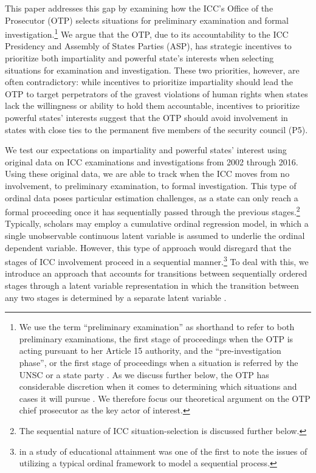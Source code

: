 This paper addresses this gap by examining how the ICC's Office of the Prosecutor (OTP) selects situations for preliminary examination and formal investigation.\footnote{We use the term ``preliminary examination'' as shorthand to refer to both preliminary examinations, the first stage of proceedings when the OTP is acting pursuant to her Article 15 authority, and the ``pre-investigation phase'', or the first stage of proceedings when a situation is referred by the UNSC or a state party \citep{schabas2011introduction}. As we discuss further below, the OTP has considerable discretion when it comes to determining which situations and cases it will pursue \citep{danner2003enhancing, schabas2011introduction, stahn2009judicial}. We therefore focus our theoretical argument on the OTP chief prosecutor as the key actor of interest.}  We argue that the OTP, due to its accountability to the ICC Presidency and Assembly of States Parties (ASP), has strategic incentives to prioritize both impartiality and powerful state's interests when selecting situations for examination and investigation. These two priorities, however, are often contradictory: while incentives to prioritize impartiality should lead the OTP to target perpetrators of the gravest violations of human rights when states lack the willingness or ability to hold them accountable, incentives to prioritize powerful states' interests suggest that the OTP should avoid involvement in states with close ties to the permanent five members of the security council (P5).

We test our expectations on impartiality and powerful states' interest using original data on ICC examinations and investigations from 2002 through 2016. Using these original data, we are able to track when the ICC moves from no involvement, to preliminary examination, to formal investigation. This type of ordinal data poses particular estimation challenges, as a state can only reach a formal proceeding once it has sequentially passed through the previous stages.\footnote{The sequential nature of ICC situation-selection is discussed further below.} Typically, scholars may employ a cumulative ordinal regression model, in which a single unobservable continuous latent variable is assumed to underlie the ordinal dependent variable. However, this type of approach would disregard that the stages of ICC involvement proceed in a sequential manner.\footnote{\citet{feinberg1980analysis} in a study of educational attainment was one of the first to note the issues of utilizing a typical ordinal framework to model a sequential process.} To deal with this, we introduce an approach that accounts for transitions between sequentially ordered stages through a latent variable representation in which the transition between any two stages is determined by a separate latent variable \citep{tutz1990sequential, albert2001sequential}.

